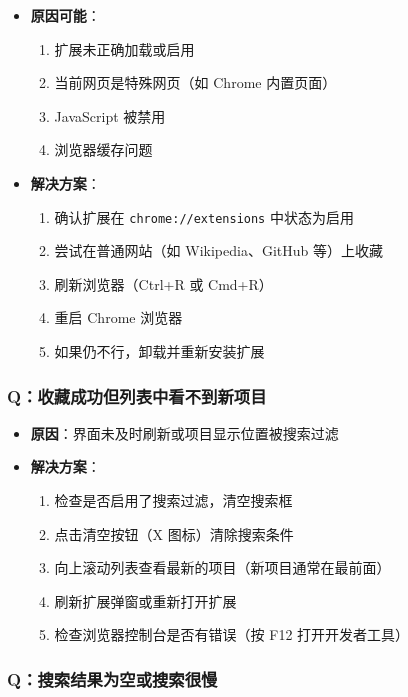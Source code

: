 \documentclass[10pt,a4paper]{article}
\begin{document}
\begin{itemize}
\begin{itemize}
\begin{itemize}
\begin{itemize}
  \item \textbf{原因可能}：
    \begin{enumerate}
      \item 扩展未正确加载或启用
      \item 当前网页是特殊网页（如 Chrome 内置页面）
      \item JavaScript 被禁用
      \item 浏览器缓存问题
    \end{enumerate}
  \item \textbf{解决方案}：
    \begin{enumerate}
      \item 确认扩展在 \texttt{chrome://extensions} 中状态为启用
      \item 尝试在普通网站（如 Wikipedia、GitHub 等）上收藏
      \item 刷新浏览器（Ctrl+R 或 Cmd+R）
      \item 重启 Chrome 浏览器
      \item 如果仍不行，卸载并重新安装扩展
    \end{enumerate}
\end{itemize}

\subsubsection{Q：收藏成功但列表中看不到新项目}

\begin{itemize}
  \item \textbf{原因}：界面未及时刷新或项目显示位置被搜索过滤
  \item \textbf{解决方案}：
    \begin{enumerate}
      \item 检查是否启用了搜索过滤，清空搜索框
      \item 点击清空按钮（X 图标）清除搜索条件
      \item 向上滚动列表查看最新的项目（新项目通常在最前面）
      \item 刷新扩展弹窗或重新打开扩展
      \item 检查浏览器控制台是否有错误（按 F12 打开开发者工具）
    \end{enumerate}
\end{itemize}

\subsubsection{Q：搜索结果为空或搜索很慢}


\end{itemize}
\end{itemize}
\end{itemize}
\end{document}

